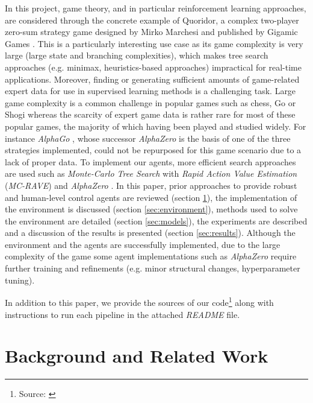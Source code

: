 \documentclass[journal, a4paper]{IEEEtran}
\begin{document}
In this project, game theory, and in particular reinforcement learning approaches, are considered through the concrete example of Quoridor, a complex two-player zero-sum strategy game designed by Mirko Marchesi and published by Gigamic Games \cite{quoridor-gigamic}. This is a particularly interesting use case as its game complexity is very large (large state and branching complexities), which makes tree search approaches (e.g. minimax, heuristics-based approaches) impractical for real-time applications. Moreover, finding or generating sufficient amounts of game-related expert data for use in supervised learning methods is a challenging task. Large game complexity is a common challenge in popular games such as chess, Go or Shogi whereas the scarcity of expert game data is rather rare for most of these popular games, the majority of which having been played and studied widely. For instance \textit{AlphaGo} \cite{alphago}, whose successor \textit{AlphaZero} \cite{alphazero} is the basis of one of the three strategies implemented, could not be repurposed for this game scenario due to a lack of proper data. To implement our agents, more efficient search approaches are used such as \textit{Monte-Carlo Tree Search} with \textit{Rapid Action Value Estimation} (\textit{MC-RAVE}) \cite{GELLY20111856} and \textit{AlphaZero} \cite{alphazero}. In this paper, prior approaches to provide robust and human-level control agents are reviewed (section \ref{sec:background}), the implementation of the environment is discussed (section \ref{sec:environment}), methods used to solve the environment are detailed (section \ref{sec:models}), the experiments are described and a discussion of the results is presented (section \ref{sec:results}).
 Although the environment and the agents are successfully implemented, due to the large complexity of the game some agent implementations such as \textit{AlphaZero} require further training and refinements (e.g. minor structural changes, hyperparameter tuning). 

In addition to this paper, we provide the sources of our code\footnote{Source: \url{}} along with instructions to run each pipeline in the attached \textit{README} file. 

\section{Background and Related Work}
\label{sec:background}
\end{document}
